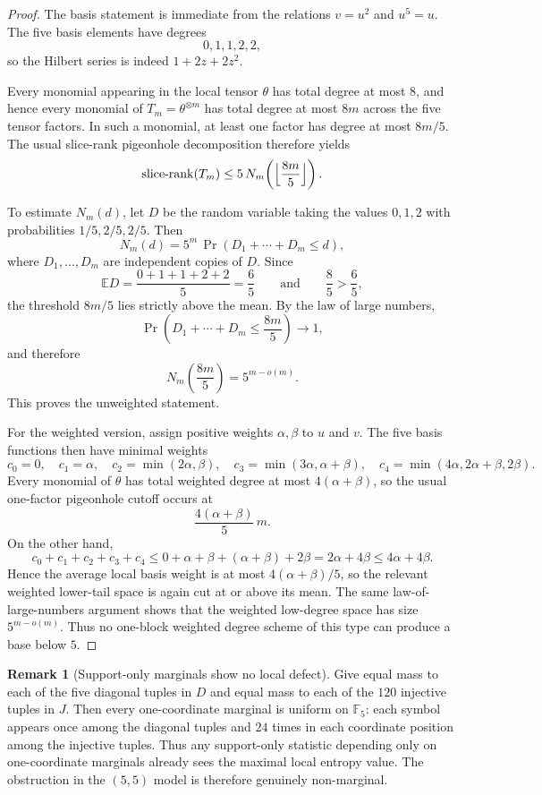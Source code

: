 \documentclass[11pt]{article}
\theoremstyle{definition}
\newtheorem{remark}[theorem]{Remark}
\newcommand{\E}{\mathbb{E}}
\newcommand{\1}{\mathbf{1}}
\begin{document}
\begin{proof}
The basis statement is immediate from the relations $v=u^2$ and $u^5=u$. The five basis elements have degrees
\[
0,1,1,2,2,
\]
so the Hilbert series is indeed $1+2z+2z^2$.

Every monomial appearing in the local tensor $\theta$ has total degree at most $8$, and hence every monomial of $T_m=\theta^{\otimes m}$ has total degree at most $8m$ across the five tensor factors. In such a monomial, at least one factor has degree at most $8m/5$. The usual slice-rank pigeonhole decomposition therefore yields
\[
\operatorname{slice\text{-}rank}(T_m)\le 5\,N_m\!\left(\Bigl\lfloor\frac{8m}{5}\Bigr\rfloor\right).
\]

To estimate $N_m(d)$, let $D$ be the random variable taking the values $0,1,2$ with probabilities $1/5,2/5,2/5$. Then
\[
N_m(d)=5^m\,\Pr(D_1+\cdots+D_m\le d),
\]
where $D_1,\dots,D_m$ are independent copies of $D$. Since
\[
\E D=\frac{0+1+1+2+2}{5}=\frac{6}{5}
\qquad\text{and}\qquad
\frac{8}{5}>\frac{6}{5},
\]
the threshold $8m/5$ lies strictly above the mean. By the law of large numbers,
\[
\Pr\!\left(D_1+\cdots+D_m\le \frac{8m}{5}\right)\to 1,
\]
and therefore
\[
N_m\!\left(\frac{8m}{5}\right)=5^{m-o(m)}.
\]
This proves the unweighted statement.

For the weighted version, assign positive weights $\alpha,\beta$ to $u$ and $v$. The five basis functions then have minimal weights
\[
c_0=0,\quad
c_1=\alpha,\quad
c_2=\min(2\alpha,\beta),\quad
c_3=\min(3\alpha,\alpha+\beta),\quad
c_4=\min(4\alpha,2\alpha+\beta,2\beta).
\]
Every monomial of $\theta$ has total weighted degree at most $4(\alpha+\beta)$, so the usual one-factor pigeonhole cutoff occurs at
\[
\frac{4(\alpha+\beta)}{5}\,m.
\]
On the other hand,
\[
c_0+c_1+c_2+c_3+c_4
\le
0+\alpha+\beta+(\alpha+\beta)+2\beta
=
2\alpha+4\beta
\le
4\alpha+4\beta.
\]
Hence the average local basis weight is at most $4(\alpha+\beta)/5$, so the relevant weighted lower-tail space is again cut at or above its mean. The same law-of-large-numbers argument shows that the weighted low-degree space has size $5^{m-o(m)}$. Thus no one-block weighted degree scheme of this type can produce a base below $5$.
\end{proof}



\begin{remark}[Support-only marginals show no local defect]\label{rem:555-support-entropy}
Give equal mass to each of the five diagonal tuples in $D$ and equal mass to each of the $120$ injective tuples in $J$. Then every one-coordinate marginal is uniform on $\mathbb F_5$: each symbol appears once among the diagonal tuples and $24$ times in each coordinate position among the injective tuples. Thus any support-only statistic depending only on one-coordinate marginals already sees the maximal local entropy value. The obstruction in the $(5,5)$ model is therefore genuinely non-marginal.
\end{remark}
\end{document}
